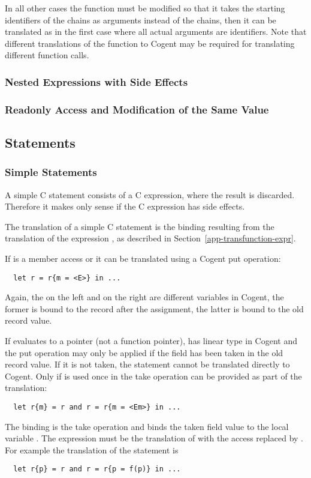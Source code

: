 In all other cases the function  must be modified so that it takes the starting identifiers of the chains as
arguments instead of the chains, then it can be translated as in the first case where all actual arguments are identifiers.
Note that different translations of the function to Cogent may be required for translating different function calls.

\subsubsection{Nested Expressions with Side Effects}

\subsubsection{Readonly Access and Modification of the Same Value}


\subsection{Statements}
\label{app-transfunction-stat}

\subsubsection{Simple Statements}

A simple C statement consists of a C expression, where the result is discarded. Therefore it makes only sense
if the C expression has side effects.

The translation of a simple C statement  is the binding resulting from the translation of the expression ,
as described in Section~\ref{app-transfunction-expr}.




If  is a member access  or  it can be translated using a Cogent put operation:
\begin{verbatim}
  let r = r{m = <E>} in ...
\end{verbatim}
Again, the  on the left and on the right are different variables in Cogent, the former is bound to the 
record after the assignment, the latter is bound to the old record value.

If  evaluates to a pointer (not a function pointer),  has linear type in Cogent and the put
operation may only be applied if the field  has been taken in the old record value. If it is not taken, the
statement cannot be translated directly to Cogent. Only if  is used once in  the take operation
can be provided as part of the translation:
\begin{verbatim}
  let r{m} = r and r = r{m = <Em>} in ...
\end{verbatim}
The binding  is the take operation and binds the taken field value to the local variable .
The expression  must be the translation of  with the access  replaced by .
For example the translation of the statement  is
\begin{verbatim}
  let r{p} = r and r = r{p = f(p)} in ...
\end{verbatim}

